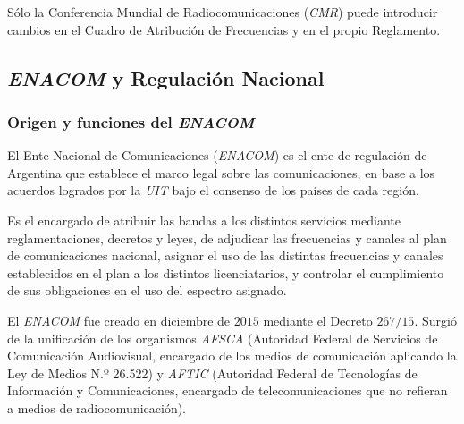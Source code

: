 \documentclass[12pt]{article}
\begin{document}
Sólo la Conferencia Mundial de Radiocomunicaciones (\textit{CMR}) puede introducir cambios en el Cuadro de Atribución de Frecuencias y en el propio Reglamento.



\subsection{\textit{ENACOM} y Regulación Nacional}
\label{sec_2.2}
\subsubsection{Origen y funciones del \textit{ENACOM}}
\label{sec_2.2.1}
El Ente Nacional de Comunicaciones (\textit{ENACOM}) es el ente de regulación de Argentina que establece el marco legal sobre las comunicaciones, en base a los acuerdos logrados por la \textit{UIT} bajo el consenso de los países de cada región. 

Es el encargado de atribuir las bandas a los distintos servicios mediante reglamentaciones, decretos y leyes, de adjudicar las frecuencias y canales al plan de comunicaciones nacional, asignar el uso de las distintas frecuencias y canales establecidos en el plan a los distintos licenciatarios, y controlar el cumplimiento de sus obligaciones en el uso del espectro asignado.

El \textit{ENACOM} fue creado en diciembre de $2015$ mediante el Decreto $267/15$. Surgió de la unificación de los organismos \textit{AFSCA} (Autoridad Federal de Servicios de Comunicación Audiovisual, encargado de los medios de comunicación aplicando la Ley de Medios N.º 26.522) y \textit{AFTIC} (Autoridad Federal de Tecnologías de Información y Comunicaciones, encargado de telecomunicaciones que no refieran a medios de radiocomunicación).
\end{document}
